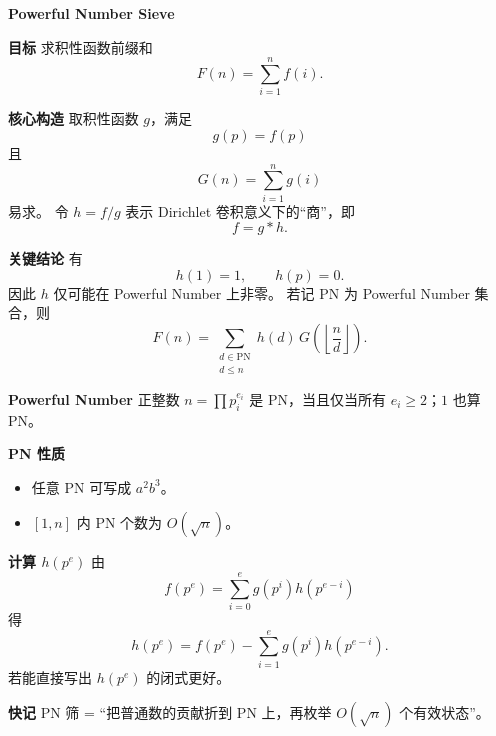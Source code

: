 \textbf{Powerful Number Sieve}

\textbf{目标}
求积性函数前缀和
\[
F(n)=\sum_{i=1}^{n}f(i).
\]

\textbf{核心构造}
取积性函数 $g$，满足
\[
g(p)=f(p)
\]
且
\[
G(n)=\sum_{i=1}^{n}g(i)
\]
易求。
令 $h=f/g$ 表示 Dirichlet 卷积意义下的“商”，即
\[
f=g*h.
\]

\textbf{关键结论}
有
\[
h(1)=1,\qquad h(p)=0.
\]
因此 $h$ 仅可能在 Powerful Number 上非零。
若记 $\mathrm{PN}$ 为 Powerful Number 集合，则
\[
F(n)=\sum_{\substack{d\in \mathrm{PN}\\ d\le n}} h(d)\,G\!\left(\left\lfloor\frac{n}{d}\right\rfloor\right).
\]

\textbf{Powerful Number}
正整数 $n=\prod p_i^{e_i}$ 是 PN，当且仅当所有 $e_i\ge 2$；$1$ 也算 PN。

\textbf{PN 性质}
\begin{itemize}
\item 任意 PN 可写成 $a^2b^3$。
\item $[1,n]$ 内 PN 个数为 $O(\sqrt n)$。
\end{itemize}

\textbf{计算 $h(p^e)$}
由
\[
f(p^e)=\sum_{i=0}^{e}g(p^i)h(p^{e-i})
\]
得
\[
h(p^e)=f(p^e)-\sum_{i=1}^{e}g(p^i)h(p^{e-i}).
\]
若能直接写出 $h(p^e)$ 的闭式更好。

\textbf{快记}
PN 筛 = “把普通数的贡献折到 PN 上，再枚举 $O(\sqrt n)$ 个有效状态”。
